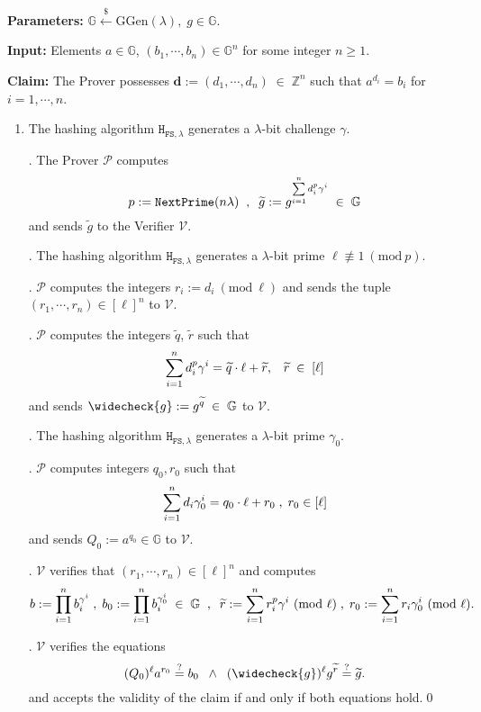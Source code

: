 \documentclass[11pt, lettersize, notitlepage, leqno, footskip=0.6cm]{article}
\newcommand{\bz}{\mathbb Z}
\newcommand{\pl}{\prod\limits}
\newcommand{\slim}{\sum\limits}
\newcommand{\ttt}{\texttt}
\newcommand{\bG}{\mathbb{G}}
\newcommand{\wti}{\widetilde}
\newcommand{\mc}{\mathcal}
\newcommand{\mb}{\mathbb}
\newcommand{\mbf}{\mathbf}
\newcommand{\mr}{\mathrm}
\newcommand{\lam}{\lambda}
\newcommand{\lamb}{\lambda}
\newcommand{\weck}{\widecheck}
\newcommand{\mP}{\mc{P}}
\newcommand{\V}{\mc{V}}
\newcommand{\vs}{\vspace{-0.15cm}}
\newcommand{\noin}{\noindent}
\newcommand{\sta}{\stackrel{?}{=}}
\newcommand{\Mod}[1]{\ (\mathrm{mod}\ #1)}
\newtheorem{Prot}[Thm]{Protocol}
\numberwithin{equation}{section}
\begin{document}
 \vspace{-0.3cm}

\noin \textbf{Parameters:} $\mb{G}\xleftarrow{\$} \mr{GGen}(\lamb), \; g\in \mb{G}$.

\noin \textbf{Input:} Elements $a\in\mb{G} $, $(b_1,\cdots,b_n)\in \mb{G}^n$ for some integer $n\geq 1$.

\noin \textbf{Claim:} The Prover possesses $\mbf{d}:= (d_1,\cdots, d_n)\;\in\;\bz^n$ such that $a^{d_i} = b_i$ for $i = 1,\cdots, n$.

\begin{enumerate}[wide, labelwidth=!, labelindent=0pt]\vs \item \normalfont The hashing algorithm ${\ttt{H}}_{{\ttt{FS}},\lam}$ generates a $\lam$-bit challenge $\gamma$.

\noin 2. The Prover $\mc{P}$ computes \vspace{-0.25cm} $$p:= \ttt{NextPrime}(n\lam)\;\;,\;\;\wti{g} := g^{\sum\limits_{i=1}^n d_i^{p}\gamma^i}\;\in\;\bG \vs $$ and sends $\wti{g}$ to the Verifier $\mc{V}$.


\noin 3. The hashing algorithm $\ttt{H}_{\ttt{FS},\lam}$ generates a $\lam$-bit prime $\ell\not\equiv 1\Mod{p}$. 

\noin 4. $\mc{P}$ computes the integers $r_i:= d_i\Mod{\ell}$ and sends the tuple $(r_1,\cdots,r_n)\in [\ell]^n$ to $\V$.

\noin 5. $\mP$ computes the integers $\wti{q}$, $\wti{r}$ such that \vs $$\slim_{i=1}^n d_i^{p}\gamma^i = \wti{q} \cdot \ell+\wti{r},\;\;\;\wti{r}\;\in\;[\ell]\vs $$ and sends $\weck{g}:= g^{\wti{q}}\;\in\;\bG$ to $\V$.

\noin 6. The hashing algorithm $\ttt{H}_{\ttt{FS},\lam}$ generates a $\lam$-bit prime $\gamma_{0}$.

\noin 7. $\mP$ computes integers $q_0, r_0$ such that \vs $$\slim_{i=1}^n d_i\gamma_{0}^i = q_0 \cdot \ell+r_0\;,\;r_0\in[\ell] \vs $$ and sends $Q_0:= a^{q_0}\in \bG$ to $\V.$

\noin 8. $\mc{V}$ verifies that $(r_1,\cdots,r_n)\in [\ell]^n$ and computes \vs $$b := \pl_{i=1}^n b_i^{\gamma^i}\;,\;b_0 := \pl_{i=1}^n b_i^{\gamma_{0}^i}\;\in \;\bG\;\;,\;\;\wti{r}:= \slim_{i=1}^n r_i^{p}\gamma^i\Mod{\ell}\;,\;r_0:=\slim_{i=1}^n r_i\gamma_{0}^i\Mod{\ell}. \vs $$ 

\noin 9. $\V$ verifies the equations \vs $$(Q_0)^{\ell}a^{r_0}\sta b_0\;\;\wedge\;\; (\weck{g})^{\ell}g^{\wti{r}}\sta\wti{g}.$$ and accepts the validity of the claim if and only if both equations hold.\qed  \end{enumerate}
\end{document}
